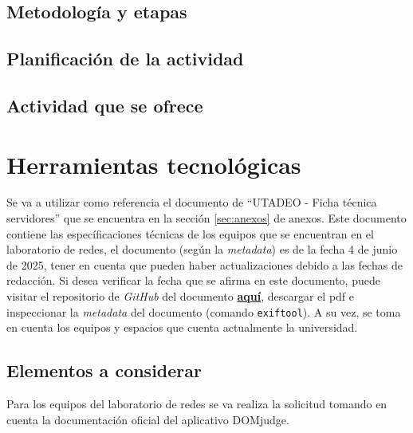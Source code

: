 \documentclass{article}
\begin{document}
\subsection{Metodología y etapas}




\subsection{Planificación de la actividad}

\subsection{Actividad que se ofrece}

\section{Herramientas tecnológicas}

Se va a utilizar como referencia el documento de ``UTADEO - Ficha técnica servidores'' que se encuentra en la sección \ref{sec:anexos} de anexos. Este documento contiene las específicaciones técnicas de los equipos que se encuentran en el laboratorio de redes, el documento (según la \textit{metadata}) es de la fecha 4 de junio de 2025, tener en cuenta que pueden haber actualizaciones debido a las fechas de redacción. Si desea verificar la fecha que se afirma en este documento, puede visitar el repositorio de \textit{GitHub} del documento \href{https://github.com/SegmentationFaultUtadeo/PropuestaMaratonUtadeo/blob/main/Bibliografia/FichaTecnica.pdf}{\textbf{aquí}}, descargar el pdf e inspeccionar la \textit{metadata} del documento (comando \texttt{exiftool}\cite{exiftool}). A su vez, se toma en cuenta los equipos y espacios que cuenta actualmente la universidad.


\subsection{Elementos a considerar}

Para los equipos del laboratorio de redes se va realiza la solicitud tomando en cuenta la documentación oficial del aplicativo DOMjudge\cite{domjudge-docs}.
\end{document}

